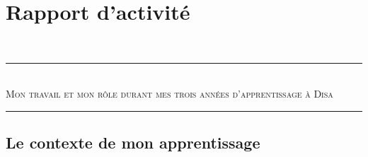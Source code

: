 \chapter{Rapport d’activité}
~
\\
\rule{\linewidth}{0.5pt}
\\[0.8cm]
{\LARGE\textsc{Mon travail et mon rôle durant mes trois années d'apprentissage à \textsc{Disa}} \\[0.4cm]}
\rule{\linewidth}{0.5pt}

\newpage
\section{Le contexte de mon apprentissage}



\newpage


\newpage


\newpage


\newpage

